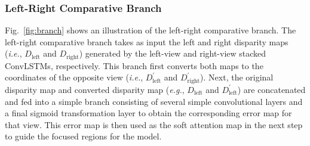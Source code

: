 \documentclass[10pt,twocolumn,letterpaper]{article}
\begin{document}
\subsubsection{Left-Right Comparative Branch}
Fig.~\ref{fig:branch} shows an illustration of the left-right comparative branch. The left-right comparative branch takes as input the left  and  right disparity  maps (\emph{i.e.}, $D_{\mathrm{left}}$ and $D_{\mathrm{right}}$) generated by the left-view and right-view stacked ConvLSTMs, respectively. This branch first converts both maps to the coordinates of the opposite view (\emph{i.e.},  $D_{\mathrm{left}}^{'}$ and $D_{\mathrm{right}}^{\prime}$). Next, the original disparity map and converted disparity map (\emph{e.g.}, $D_{\mathrm{left}}$ and $D_{\mathrm{left}}^{\prime}$) are concatenated and fed into a simple branch consisting of several simple convolutional layers and a final sigmoid transformation layer to obtain the corresponding error map for that view. This error map is then used as the soft attention map in the next step to guide the focused regions for the model.
\end{document}
